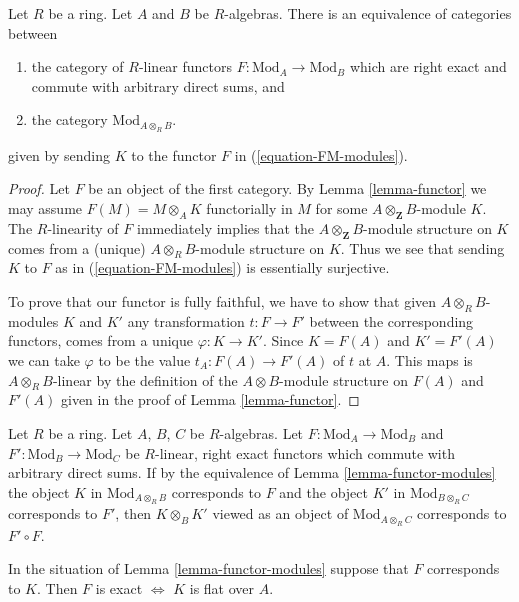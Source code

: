 \begin{lemma}
\label{lemma-functor-modules}
Let $R$ be a ring. Let $A$ and $B$ be $R$-algebras. There is an
equivalence of categories between
\begin{enumerate}
\item the category of $R$-linear functors
$F : \text{Mod}_A \to \text{Mod}_B$ which
are right exact and commute with arbitrary direct sums, and
\item the category $\text{Mod}_{A \otimes_R B}$.
\end{enumerate}
given by sending $K$ to the functor $F$ in (\ref{equation-FM-modules}).
\end{lemma}

\begin{proof}
Let $F$ be an object of the first category. By
Lemma \ref{lemma-functor} we may assume $F(M) = M \otimes_A K$
functorially in $M$ for some $A \otimes_\mathbf{Z} B$-module $K$.
The $R$-linearity of $F$ immediately implies that the
$A \otimes_\mathbf{Z} B$-module structure on $K$ comes
from a (unique) $A \otimes_R B$-module structure on $K$.
Thus we see that sending $K$ to $F$ as in (\ref{equation-FM-modules})
is essentially surjective.

\medskip\noindent
To prove that our functor is fully faithful, we have to show that
given $A \otimes_R B$-modules $K$ and $K'$ any transformation
$t : F \to F'$ between the corresponding functors, comes from
a unique $\varphi : K \to K'$. Since $K = F(A)$ and $K' = F'(A)$
we can take $\varphi$ to be the value $t_A : F(A) \to F'(A)$
of $t$ at $A$. This maps is $A \otimes_R B$-linear by the
definition of the $A \otimes B$-module structure on $F(A)$
and $F'(A)$ given in the proof of Lemma \ref{lemma-functor}.
\end{proof}

\begin{remark}
\label{remark-composition}
Let $R$ be a ring. Let $A$, $B$, $C$ be $R$-algebras.
Let $F : \text{Mod}_A \to \text{Mod}_B$ and
$F' : \text{Mod}_B \to \text{Mod}_C$ be
$R$-linear, right exact functors which commute with arbitrary direct sums.
If by the equivalence of Lemma \ref{lemma-functor-modules} the object
$K$ in $\text{Mod}_{A \otimes_R B}$ corresponds to $F$ and the object
$K'$ in $\text{Mod}_{B \otimes_R C}$ corresponds to $F'$, then
$K \otimes_B K'$ viewed as an object of
$\text{Mod}_{A \otimes_R C}$ corresponds to $F' \circ F$.
\end{remark}

\begin{remark}
\label{remark-exact-flat}
In the situation of Lemma \ref{lemma-functor-modules}
suppose that $F$ corresponds to $K$. Then
$F$ is exact $\Leftrightarrow$ $K$ is flat over $A$.
\end{remark}

